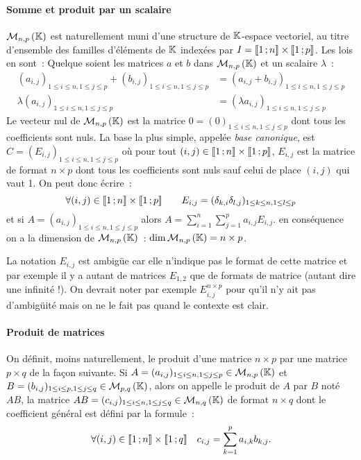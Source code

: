 \paragraph{Somme et produit par un scalaire}
$\mathcal{M}_{n,p}\left(\mathbb{K}\right)$ est naturellement muni d'une structure de $\mathbb{K}$-espace vectoriel, au titre d'ensemble des familles d'éléments de $\mathbb{K}$ indexées par $I = \mathopen{\llbracket}1\mathclose{}\mathpunct{};n\mathclose{\rrbracket} \times \mathopen{\llbracket}1\mathclose{}\mathpunct{};p\mathclose{\rrbracket}$. Les lois en sont~: Quelque soient les matrices $a$ et $b$ dans $\mathcal{M}_{n,p}\left(\mathbb{K}\right)$ et un scalaire $\lambda$~:
\begin{align}
	(a_{i,j})_{1\leq i \leq n, 1 \leq j \leq p} + (b_{i,j})_{1\leq i \leq n, 1 \leq j \leq p} & = (a_{i,j}+b_{i,j})_{1\leq i \leq n, 1 \leq j \leq p} \\
	\lambda  (a_{i,j})_{1\leq i \leq n, 1 \leq j \leq p} &= (\lambda a_{i,j})_{1\leq i \leq n, 1 \leq j \leq p}
\end{align}
Le vecteur nul de $\mathcal{M}_{n,p}\left(\mathbb{K}\right)$ est la matrice $0 = (0)_{1\leq i \leq n, 1 \leq j \leq p}$ dont tous les coefficients sont nuls. La base la plus simple, appelée \emph{base canonique}, est $C = (E_{i,j})_{1\leq i \leq n, 1 \leq j \leq p}$ où pour tout $(i,j) \in \mathopen{\llbracket}1\mathclose{}\mathpunct{};n\mathclose{\rrbracket} \times \mathopen{\llbracket}1\mathclose{}\mathpunct{};p\mathclose{\rrbracket}$, $E_{i,j}$ est la matrice de format $n \times p$ dont tous les coefficients sont nuls sauf celui de place $(i, j)$ qui vaut 1. On peut donc écrire~:
\begin{equation}
	\forall (i,j) \in \mathopen{\llbracket}1\mathclose{}\mathpunct{};n\mathclose{\rrbracket} \times \mathopen{\llbracket}1\mathclose{}\mathpunct{};p\mathclose{\rrbracket} \qquad E_{i,j} = (\delta_{k,i} \delta_{l,j})_{1\leq k \leq n, 1 \leq l \leq p}
\end{equation}
et si $A = (a_{i,j})_{1\leq i \leq n, 1 \leq j \leq p}$ alors $A = \sum_{i=1}^n \sum_{j=1}^p a_{i,j} E_{i,j}$. en conséquence on a la dimension de $\mathcal{M}_{n,p}\left(\mathbb{K}\right)$~: $\operatorname{dim}{\mathcal{M}_{n,p}\left(\mathbb{K}\right)} = n \times p$.
\begin{remarque}
	La notation $E_{i,j}$ est ambigüe car elle n'indique pas le format de cette matrice et par exemple il y a autant de matrices $E_{1,2}$ que de formats de matrice (autant dire une infinité !). On devrait noter par exemple $E_{i,j}^{n\times p}$ pour qu'il n'y ait pas d'ambigüité mais on ne le fait pas quand le contexte est clair.
\end{remarque}
\paragraph{Produit de matrices}
On définit, moins naturellement, le produit d'une matrice $n \times p$ par une matrice $p \times q$ de la façon suivante. Si $A  = (a_{i,j})_{1\leq i \leq n, 1 \leq j \leq p} \in \mathcal{M}_{n,p}\left(\mathbb{K}\right)$ et $B  = (b_{i,j})_{1\leq i \leq p, 1 \leq j \leq q} \in \mathcal{M}_{p,q}\left(\mathbb{K}\right)$, alors on appelle le produit de $A$ par $B$ noté $AB$, la matrice $AB=(c_{i,j})_{1\leq i \leq n, 1\leq j \leq q} \in \mathcal{M}_{n,q}\left(\mathbb{K}\right)$ de format $n \times q$ dont le coefficient général est défini par la formule~:
\begin{equation}
	\forall (i,j) \in \mathopen{\llbracket}1\mathclose{}\mathpunct{};n\mathclose{\rrbracket} \times \mathopen{\llbracket}1\mathclose{}\mathpunct{};q\mathclose{\rrbracket} \quad c_{i,j} = \sum_{k=1}^p a_{i,k}b_{k,j}.
\end{equation}

